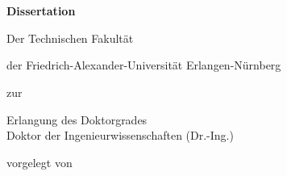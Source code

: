 \begin{titlepage}
    \begin{addmargin}[-1cm]{-3cm}
    \begin{center}
        \large

        \hfill

        \vfill

        \begingroup
            \color{CTtitle}{\huge\myTitle} \\ \bigskip \bigskip
            \color{CTtitle}{\huge\myTitleGerman} \\ \bigskip
        \endgroup
        
        \medskip
        \vfill

        \large
        \textbf{Dissertation}\\ \medskip
        
        \vspace{5ex}

			Der Technischen Fakultät

			der Friedrich-Alexander-Universität Erlangen-Nürnberg


			zur

			Erlangung des Doktorgrades\\

			Doktor der Ingenieurwissenschaften (Dr.-Ing.)


			\vspace{5ex}

			vorgelegt von

			\myName

        \vfill

    \end{center}
  \end{addmargin}
\end{titlepage}
